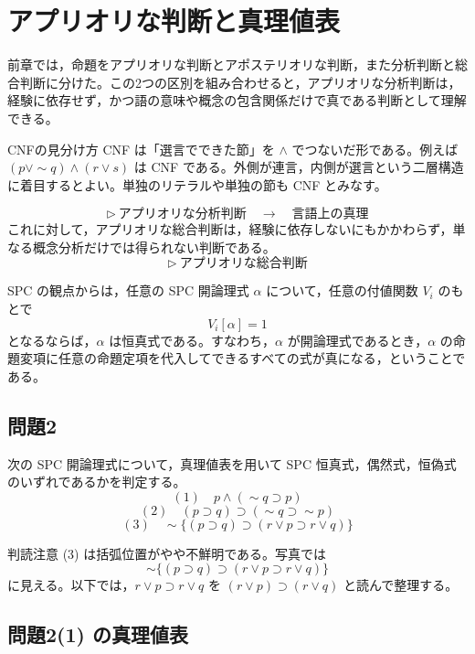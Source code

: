 \documentclass[../main.tex]{subfiles}
\begin{document}
\section{アプリオリな判断と真理値表}

前章では，命題をアプリオリな判断とアポステリオリな判断，また分析判断と総合判断に分けた。この2つの区別を組み合わせると，アプリオリな分析判断は，経験に依存せず，かつ語の意味や概念の包含関係だけで真である判断として理解できる。
\begin{sidebox}[TBred]{CNFの見分け方}
  CNF は「選言でできた節」を \(\land\) でつないだ形である。例えば \((p\lor\sim q)\land(r\lor s)\) は CNF である。外側が連言，内側が選言という二層構造に着目するとよい。単独のリテラルや単独の節も CNF とみなす。
\end{sidebox}
\[
  \triangleright\ \text{アプリオリな分析判断}
  \quad
  \longrightarrow
  \quad
  \text{言語上の真理}
\]
これに対して，アプリオリな総合判断は，経験に依存しないにもかかわらず，単なる概念分析だけでは得られない判断である。
\[
  \triangleright\ \text{アプリオリな総合判断}
\]

SPC の観点からは，任意の SPC 開論理式 \(\alpha\) について，任意の付値関数 \(V_i\) のもとで
\[
  V_i[\alpha] = 1
\]
となるならば，\(\alpha\) は恒真式である。すなわち，\(\alpha\) が開論理式であるとき，\(\alpha\) の命題変項に任意の命題定項を代入してできるすべての式が真になる，ということである。

\subsection{問題2}

次の SPC 開論理式について，真理値表を用いて SPC 恒真式，偶然式，恒偽式のいずれであるかを判定する。
\[
  (1)\quad
  p \land (\sim q \supset p)
\]
\[
  (2)\quad
  (p \supset q) \supset (\sim q \supset \sim p)
\]
\[
  (3)\quad
  \sim\{(p \supset q) \supset (r \lor p \supset r \lor q)\}
\]

\begin{sidebox}[TBred]{判読注意}
  (3) は括弧位置がやや不鮮明である。写真では
  \[
    \sim\{(p\supset q)\supset(r\lor p\supset r\lor q)\}
  \]
  に見える。以下では，\(r\lor p\supset r\lor q\) を \((r\lor p)\supset(r\lor q)\) と読んで整理する。
\end{sidebox}

\subsection{問題2(1) の真理値表}
\end{document}
